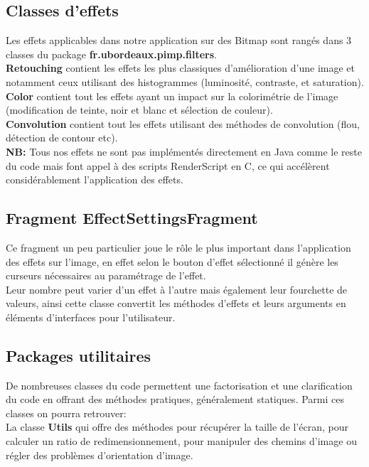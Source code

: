 \subsection{Classes d'effets}
Les effets applicables dans notre application sur des Bitmap sont rangés dans 3 classes du package \textbf{fr.ubordeaux.pimp.filters}.
\\
\textbf{Retouching} contient les effets les plus classiques d'amélioration d'une image et notamment ceux utilisant des histogrammes (luminosité, contraste, et saturation).
\\
\textbf{Color} contient tout les effets ayant un impact sur la colorimétrie de l'image (modification de teinte, noir et blanc et sélection de couleur).
\\
\textbf{Convolution} contient tout les effets utilisant des méthodes de convolution (flou, détection de contour etc).
\\
\textbf{NB:} Tous nos effets ne sont pas implémentés directement en Java comme le reste du code mais font appel à des scripts RenderScript en C, ce qui accélèrent considérablement l'application des effets.

\subsection{Fragment \textbf{EffectSettingsFragment}} \label{effect_settings}
Ce fragment un peu particulier joue le rôle le plus important dans l'application des effets sur l'image, en effet selon le bouton d'effet sélectionné il génère les curseurs nécessaires au paramétrage de l'effet.
\\
Leur nombre peut varier d'un effet à l'autre mais également leur fourchette de valeurs, ainsi cette classe convertit les méthodes d'effets et leurs arguments en éléments d'interfaces pour l'utilisateur.

\subsection{Packages utilitaires}
De nombreuses classes du code permettent une factorisation et une clarification du code en offrant des méthodes pratiques, généralement statiques. Parmi ces classes on pourra retrouver:
\\

La classe \textbf{Utils} qui offre des méthodes pour récupérer la taille de l'écran, pour calculer un ratio de redimensionnement, pour manipuler des chemins d'image ou régler des problèmes d'orientation d'image.
\\

